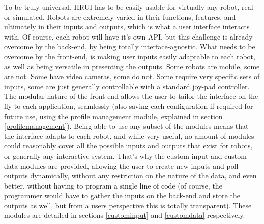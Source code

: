 To be truly universal, HRUI has to be easily usable for virtually any robot, real or simulated. Robots are extremely varied in 
their functions, features, and ultimately in their inputs and outputs, which is what a user interface interacts with. Of 
course, each robot will have it's own API, but this challenge is already overcome by the back-end, by being totally 
interface-agnostic. What needs to be overcome by the front-end, is making user inputs easily adaptable to each robot, as well 
as being versatile in presenting the outputs. Some robots are mobile, some are not. Some have video cameras, some do not. Some 
require very specific sets of inputs, some are just generally controllable with a standard joy-pad controller. The modular 
nature of the front-end allows the user to tailor the interface on the fly to each application, seamlessly (also saving each 
configuration if required for future use, using the profile management module, explained in section \ref{profilemanagement}).
Being able to use any subset of the modules means that the interface adapts to each robot, and while very useful, no amount of 
modules could reasonably cover all the possible inputs and outputs that exist for robots, or generally any interactive system. 
That's why the custom input and custom data modules are provided, allowing the user to create new inputs and poll outputs 
dynamically, without any restriction on the nature of the data, and even better, without having to program a single line of 
code (of course, the programmer would have to gather the inputs on the back-end and store the outputs as well, but from a 
users perspective this is totally transparent). These modules are detailed in sections \ref{custominput} and \ref{customdata} 
respectively.\\

